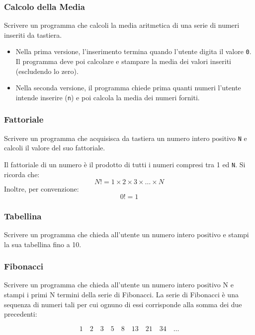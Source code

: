 \documentclass[a4paper,12pt]{article}
\begin{document}
\subsubsection{Calcolo della Media}
Scrivere un programma che calcoli la media aritmetica di una serie di numeri inseriti da tastiera.

\begin{itemize}
	\item Nella prima versione, l'inserimento termina quando l'utente digita il valore \texttt{0}. Il programma deve poi calcolare e stampare la media dei valori inseriti (escludendo lo zero).
	\item Nella seconda versione, il programma chiede prima quanti numeri l'utente intende inserire (\texttt{n}) e poi calcola la media dei numeri forniti.
\end{itemize}


\subsubsection{Fattoriale}
Scrivere un programma che acquisisca da tastiera un numero intero positivo \texttt{N} e calcoli il valore del suo fattoriale.

Il fattoriale di un numero è il prodotto di tutti i numeri compresi tra 1 ed \texttt{N}.  
Si ricorda che:
\[
N! = 1 \times 2 \times 3 \times \dots \times N
\]
Inoltre, per convenzione:
\[
0! = 1
\]

\subsubsection{Tabellina}
Scrivere un programma che chieda all'utente un numero intero positivo e stampi la sua tabellina fino a 10.


\subsubsection{Fibonacci}
Scrivere un programma che chieda all'utente un numero intero positivo N e stampi i primi N termini della serie di Fibonacci.
La serie di Fibonacci è una sequenza di numeri tali per cui ognuno di essi corrisponde alla somma dei due precedenti:

\[
1 \quad 2 \quad 3 \quad 5 \quad 8 \quad 13 \quad 21 \quad 34 \quad \dots
\]










\newpage
\end{document}
